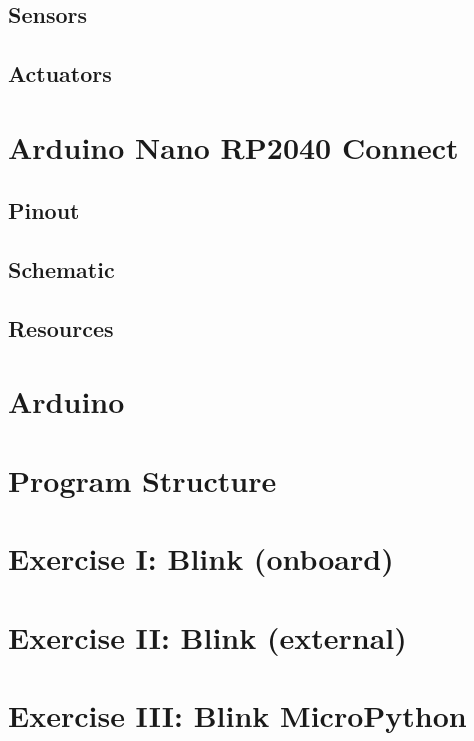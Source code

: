 \documentclass[aspectratio=169]{beamer}
\begin{document}
\subsection{Sensors}

\subsection{Actuators}


\section{Arduino\textregistered{} Nano RP2040 Connect}


\subsection{Pinout}

\subsection{Schematic}

\subsection{Resources}


\section{Arduino\textregistered{} }


\section{Program Structure}


\section{Exercise I: Blink  (onboard)}


\section{Exercise II: Blink  (external)}


\section{Exercise III: Blink MicroPython}

\end{document}
